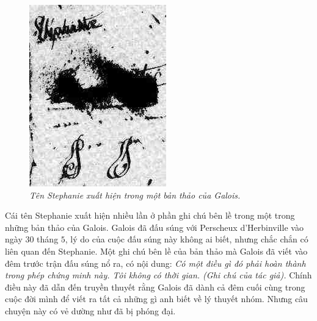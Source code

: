 \begin{multicols}{2}
	\begin{figure}[H]
		\vspace*{-5pt}
		\centering
		\captionsetup{labelformat= empty, justification=centering}
		\includegraphics[width= 1\linewidth]{3}
		\caption{\small\textit{\color{lichsutoanhoc}Tên Stephanie xuất hiện trong một bản thảo của Galois.}}
		\vspace*{-10pt}
	\end{figure}
	Cái tên Stephanie xuất hiện nhiều lần ở phần ghi chú bên lề trong một trong những bản thảo của Galois. 
	\vskip 0.1cm
	Galois đã đấu súng với Perscheux d'Herbinville vào ngày $30$ tháng $5$, lý do của cuộc đấu súng này không ai biết, nhưng chắc chắn có liên quan đến Stephanie.
	\vskip 0.1cm
	Một ghi chú bên lề của bản thảo mà Galois đã viết vào đêm trước trận đấu súng nổ ra, có nội dung:
	\vskip 0.1cm
	\textit{Có một điều gì đó phải hoàn thành trong phép chứng minh này. Tôi không có thời gian. (Ghi chú của tác giả).}
	\vskip 0.1cm
	Chính điều này đã dẫn đến truyền thuyết rằng Galois đã dành cả đêm cuối cùng trong cuộc đời mình để viết ra tất cả những gì anh biết về lý thuyết nhóm. Nhưng câu chuyện này có vẻ dường như đã bị phóng đại.

\end{multicols}
